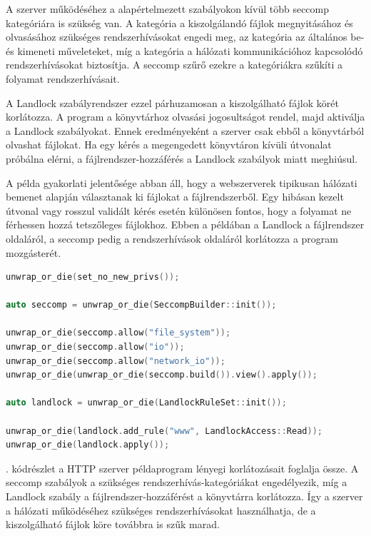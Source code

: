 A szerver működéséhez a  alapértelmezett szabályokon kívül több
seccomp kategóriára is szükség van. A  kategória a
kiszolgálandó fájlok megnyitásához és olvasásához szükséges rendszerhívásokat
engedi meg, az  kategória az általános be- és kimeneti műveleteket,
míg a  kategória a hálózati kommunikációhoz
kapcsolódó rendszerhívásokat biztosítja. A seccomp szűrő ezekre a kategóriákra
szűkíti a folyamat rendszerhívásait.

A Landlock szabályrendszer ezzel párhuzamosan a kiszolgálható fájlok körét
korlátozza. A program a  könyvtárhoz olvasási jogosultságot rendel,
majd aktiválja a Landlock szabályokat. Ennek eredményeként a szerver csak ebből
a könyvtárból olvashat fájlokat. Ha egy kérés a megengedett könyvtáron kívüli
útvonalat próbálna elérni, a fájlrendszer-hozzáférés a Landlock szabályok miatt
meghiúsul.

A példa gyakorlati jelentősége abban áll, hogy a webszerverek tipikusan
hálózati bemenet alapján választanak ki fájlokat a fájlrendszerből. Egy
hibásan kezelt útvonal vagy rosszul validált kérés esetén különösen fontos,
hogy a folyamat ne férhessen hozzá tetszőleges fájlokhoz. Ebben a példában a
Landlock a fájlrendszer oldaláról, a seccomp pedig a rendszerhívások oldaláról
korlátozza a program mozgásterét.

\begin{lstlisting}[float, language=C++, caption={A \code{http\_\allowbreak server} példaprogram korlátozásainak vázlata}, label={lst:example-http-server-sandbox}]
unwrap_or_die(set_no_new_privs());

auto seccomp = unwrap_or_die(SeccompBuilder::init());

unwrap_or_die(seccomp.allow("file_system"));
unwrap_or_die(seccomp.allow("io"));
unwrap_or_die(seccomp.allow("network_io"));
unwrap_or_die(unwrap_or_die(seccomp.build()).view().apply());

auto landlock = unwrap_or_die(LandlockRuleSet::init());

unwrap_or_die(landlock.add_rule("www", LandlockAccess::Read));
unwrap_or_die(landlock.apply());
\end{lstlisting}

. kódrészlet a HTTP szerver példaprogram
lényegi korlátozásait foglalja össze. A seccomp szabályok a szükséges
rendszerhívás-kategóriákat engedélyezik, míg a Landlock szabály a
fájlrendszer-hozzáférést a  könyvtárra korlátozza. Így a szerver a
hálózati működéséhez szükséges rendszerhívásokat használhatja, de a
kiszolgálható fájlok köre továbbra is szűk marad.
